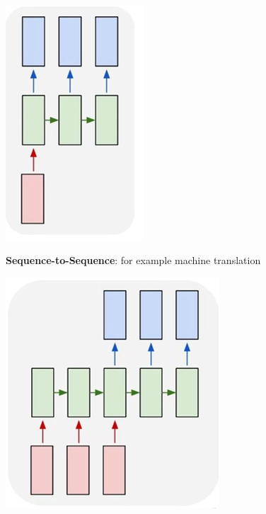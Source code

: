 \documentclass[10pt]{report}
\begin{document}
\begin{list}{}{}
\begin{center}
		\includegraphics[scale=0.5]{88.png}
	\end{center}
	\item \textbf{Sequence-to-Sequence}: for example machine translation
	\begin{center}
		\includegraphics[scale=0.5]{89.png}
	\end{center}
\end{list}
\end{document}
